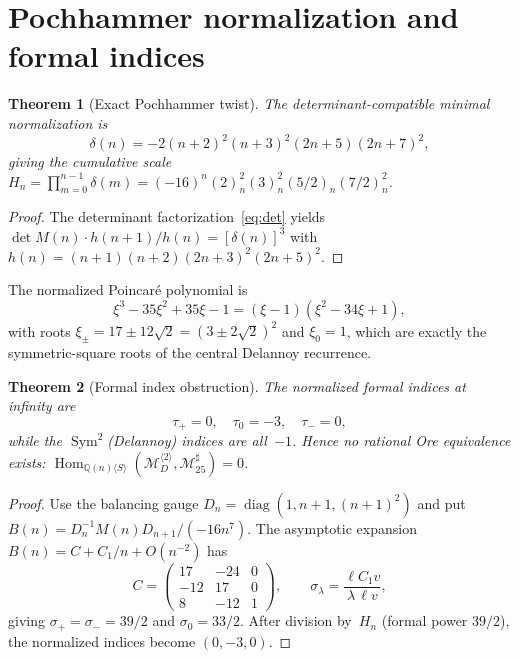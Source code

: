 \documentclass[11pt]{article}
\newtheorem{theorem}{Theorem}
\begin{document}
\section{Pochhammer normalization and formal indices}

\begin{theorem}[Exact Pochhammer twist]\label{thm:pochhammer}
The determinant-compatible minimal normalization is
\begin{equation}\label{eq:delta}
\delta(n) = -2(n{+}2)^2(n{+}3)^2(2n{+}5)(2n{+}7)^2,
\end{equation}
giving the cumulative scale
$H_n = \prod_{m=0}^{n-1}\delta(m)
= (-16)^n(2)_n^2(3)_n^2(5/2)_n(7/2)_n^2$.
\end{theorem}

\begin{proof}
The determinant factorization~\eqref{eq:det} yields
$\det M(n) \cdot h(n{+}1)/h(n) = [\delta(n)]^3$
with $h(n) = (n{+}1)(n{+}2)(2n{+}3)^2(2n{+}5)^2$.
\end{proof}

The normalized Poincar\'e polynomial is
\begin{equation}\label{eq:norm-poincare}
\xi^3 - 35\xi^2 + 35\xi - 1 = (\xi - 1)(\xi^2 - 34\xi + 1),
\end{equation}
with roots $\xi_\pm = 17 \pm 12\sqrt{2} = (3 \pm 2\sqrt{2})^2$
and $\xi_0 = 1$, which are exactly the symmetric-square roots
of the central Delannoy recurrence.

\begin{theorem}[Formal index obstruction]\label{thm:formal}
The normalized formal indices at infinity are
\[
\tau_+ = 0,\quad \tau_0 = -3,\quad \tau_- = 0,
\]
while the $\operatorname{Sym}^2$(Delannoy) indices are all~$-1$.
Hence no rational Ore equivalence exists:
$\operatorname{Hom}_{\mathbb{Q}(n)\langle S\rangle}(
\mathcal{M}_D^{\langle 2\rangle},
\mathcal{M}_{25}^{\sharp}) = 0$.
\end{theorem}

\begin{proof}
Use the balancing gauge $D_n = \operatorname{diag}(1, n{+}1, (n{+}1)^2)$
and put $B(n) = D_n^{-1}M(n)D_{n+1}/(-16n^7)$. The asymptotic
expansion $B(n) = C + C_1/n + O(n^{-2})$ has
\[
C = \begin{pmatrix} 17&{-}24&0\\-12&17&0\\8&{-}12&1\end{pmatrix},
\qquad \sigma_\lambda = \frac{\ell C_1 v}{\lambda\,\ell v},
\]
giving $\sigma_+ = \sigma_- = 39/2$ and $\sigma_0 = 33/2$.
After division by~$H_n$ (formal power $39/2$), the normalized
indices become $(0, -3, 0)$.
\end{proof}
\end{document}
